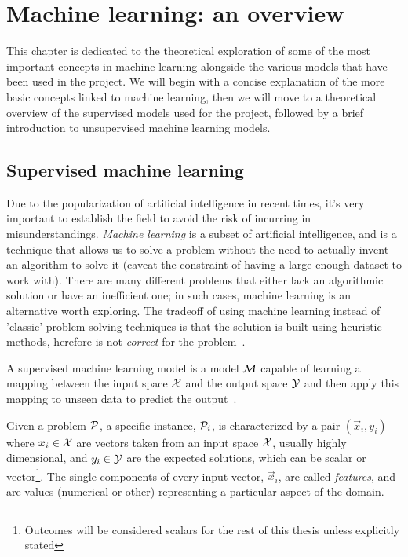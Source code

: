 \chapter{Machine learning: an overview}
\label{chp:ml}
This chapter is dedicated to the theoretical exploration of some of the most important concepts in
machine learning alongside the various models that have been used in the project. We will begin with
a concise explanation of the more basic concepts linked to machine learning, then we will move to a
theoretical overview of the supervised models used for the project, followed by a brief introduction to
unsupervised machine learning models.

\section{Supervised machine learning}
\label{sec:sml}
Due to the popularization of artificial intelligence in recent times, it's very important to establish the field to avoid the risk of
incurring in misunderstandings. \emph{Machine learning} is a subset of artificial
intelligence, and is a technique that allows us to solve a problem without the need to actually invent an
algorithm to solve it (caveat the constraint of having a large enough dataset to work with). There are many different problems that
either lack an algorithmic solution or have an inefficient one; in such cases, machine learning is
an alternative worth exploring. The tradeoff of using machine learning instead of 'classic'
problem-solving techniques is that the solution is built using heuristic methods,
 herefore is not \emph{correct} for the problem~\cite{Rebala2019}.

\medskip

A supervised machine learning model is a model $\mathcal{M}$ capable of learning a mapping between the
input space $\mathcal{X}$ and the output space $\mathcal{Y}$ and then apply this mapping to unseen
data to predict the output~\cite{Cunningham2008}.

\smallskip

Given a problem $\mathcal{P}$, a specific instance, $\mathcal{P}_i$, is characterized by a pair
$(\vec{x}_i, y_i)$ where $\boldsymbol{x}_i \in \mathcal{X}$ are vectors taken from an input space $\mathcal{X}$, usually
highly dimensional, and $y_i \in \mathcal{Y}$ are the expected solutions, which can be scalar or
vector\footnote{Outcomes will be considered scalars for the rest of this thesis unless explicitly
	stated}. The single components of every input vector, $\vec{x}_i$, are called
\emph{features}, and are values (numerical or other) representing a particular aspect of the domain.

